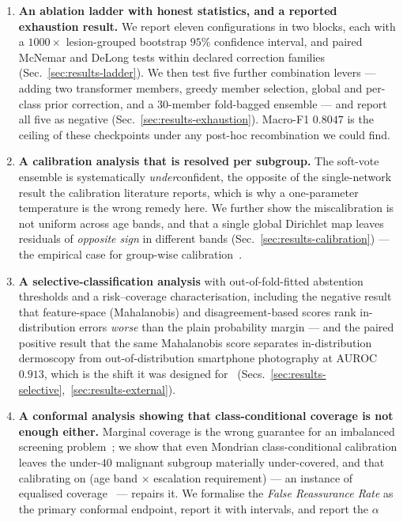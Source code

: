 \documentclass[journal]{IEEEtran}
\begin{document}
\begin{enumerate}
\item \textbf{An ablation ladder with honest statistics, and a reported exhaustion result.}
We report eleven configurations in two blocks, each with a $1000\times$ lesion-grouped
bootstrap $95\%$ confidence interval, and paired McNemar and DeLong tests within declared
correction families (Sec.~\ref{sec:results-ladder}). We then test five further combination
levers --- adding two transformer members, greedy member selection, global and per-class
prior correction, and a $30$-member fold-bagged ensemble --- and report all five as negative
(Sec.~\ref{sec:results-exhaustion}). Macro-F1 $0.8047$ is the ceiling of these checkpoints
under any post-hoc recombination we could find.
\item \textbf{A calibration analysis that is resolved per subgroup.} The soft-vote ensemble
is systematically \emph{under}confident, the opposite of the single-network result the
calibration literature reports, which is why a one-parameter temperature is the wrong remedy
here. We further show the miscalibration is not uniform across age bands, and that a single
global Dirichlet map leaves residuals of \emph{opposite sign} in different bands
(Sec.~\ref{sec:results-calibration}) --- the empirical case for group-wise
calibration~\cite{hebertjohnson2018multicalibration}.
\item \textbf{A selective-classification analysis} with out-of-fold-fitted abstention
thresholds and a risk--coverage characterisation, including the negative result that
feature-space (Mahalanobis) and disagreement-based scores rank in-distribution errors
\emph{worse} than the plain probability margin --- and the paired positive result that the
same Mahalanobis score separates in-distribution dermoscopy from out-of-distribution
smartphone photography at AUROC $0.913$, which is the shift it was designed
for~\cite{ovadia2019shift} (Secs.~\ref{sec:results-selective},~\ref{sec:results-external}).
\item \textbf{A conformal analysis showing that class-conditional coverage is not enough
either.} Marginal coverage is the wrong guarantee for an imbalanced screening
problem~\cite{vovk2012conditional}; we show that even Mondrian class-conditional calibration
leaves the under-$40$ malignant subgroup materially under-covered, and that calibrating on
(age band $\times$ escalation requirement) --- an instance of equalised
coverage~\cite{romano2020equalized} --- repairs it. We formalise the \emph{False Reassurance
Rate} as the primary conformal endpoint, report it with intervals, and report the $\alpha$

\end{enumerate}
\end{document}
